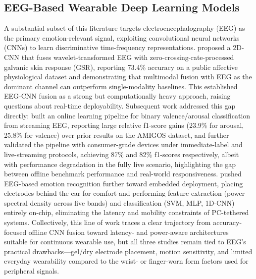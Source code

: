 \subsection{EEG-Based Wearable Deep Learning Models}
A substantial subset of this literature targets electroencephalography (EEG) as the primary emotion-relevant signal, exploiting convolutional neural networks (CNNs) to learn discriminative time-frequency representations. \cite{kwon2018electroencephalography} proposed a 2D-CNN that fuses wavelet-transformed EEG with zero-crossing-rate-processed galvanic skin response (GSR), reporting 73.4\% accuracy on a public affective physiological dataset and demonstrating that multimodal fusion with EEG as the dominant channel can outperform single-modality baselines. This established EEG-CNN fusion as a strong but computationally heavy approach, raising questions about real-time deployability. Subsequent work addressed this gap directly: \cite{moontaha2023online} built an online learning pipeline for binary valence/arousal classification from streaming EEG, reporting large relative f1-score gains (23.9\% for arousal, 25.8\% for valence) over prior results on the AMIGOS dataset, and further validated the pipeline with consumer-grade devices under immediate-label and live-streaming protocols, achieving 87\% and 82\% f1-scores respectively, albeit with performance degradation in the fully live scenario, highlighting the gap between offline benchmark performance and real-world responsiveness. \cite{mai2023real} pushed EEG-based emotion recognition further toward embedded deployment, placing electrodes behind the ear for comfort and performing feature extraction (power spectral density across five bands) and classification (SVM, MLP, 1D-CNN) entirely on-chip, eliminating the latency and mobility constraints of PC-tethered systems. Collectively, this line of work traces a clear trajectory from accuracy-focused offline CNN fusion toward latency- and power-aware architectures suitable for continuous wearable use, but all three studies remain tied to EEG's practical drawbacks---gel/dry electrode placement, motion sensitivity, and limited everyday wearability compared to the wrist- or finger-worn form factors used for peripheral signals.

